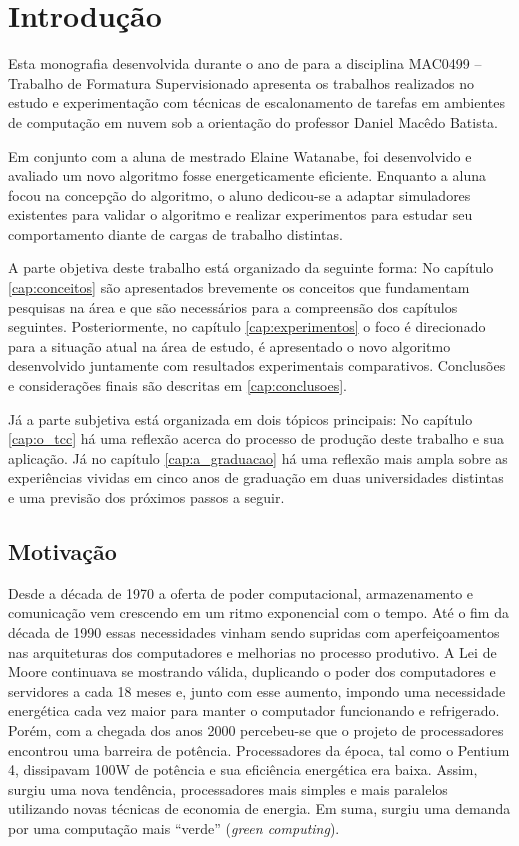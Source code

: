 \chapter{Introdução}
\label{cap:introducao}
Esta monografia desenvolvida durante o ano de  para a disciplina MAC0499 --
Trabalho de Formatura Supervisionado apresenta os trabalhos realizados no estudo
e experimentação com técnicas de escalonamento de tarefas em ambientes de 
computação em nuvem sob a orientação do professor Daniel Macêdo Batista.

Em conjunto com a aluna de mestrado Elaine Watanabe, foi desenvolvido e avaliado
um novo algoritmo fosse energeticamente eficiente. Enquanto a aluna focou na
concepção do algoritmo, o aluno dedicou-se a adaptar simuladores existentes para
validar o algoritmo e realizar experimentos para estudar seu comportamento 
diante de cargas de trabalho distintas.

A parte objetiva deste trabalho está organizado da seguinte forma: No capítulo
\ref{cap:conceitos} são apresentados brevemente os conceitos que fundamentam
pesquisas na área e que são necessários para a compreensão dos capítulos
seguintes. Posteriormente, no capítulo \ref{cap:experimentos} o foco é
direcionado para a situação atual na área de estudo, é apresentado o novo
algoritmo desenvolvido juntamente com resultados experimentais
comparativos. Conclusões e considerações finais são descritas em
\ref{cap:conclusoes}.

Já a parte subjetiva está organizada em dois tópicos principais: No capítulo 
\ref{cap:o_tcc} há uma reflexão acerca do processo de produção deste trabalho
e sua aplicação. Já no capítulo \ref{cap:a_graduacao} há uma reflexão mais ampla
sobre as experiências vividas em cinco anos de graduação em duas universidades
distintas e uma previsão dos próximos passos a seguir.


\section{Motivação}
\label{sec:motivacao}
Desde a década de 1970 a oferta de poder computacional, armazenamento e
comunicação vem crescendo em um ritmo exponencial com o tempo. Até o fim da
década de 1990 essas necessidades vinham sendo supridas com aperfeiçoamentos nas
arquiteturas dos computadores e melhorias no processo produtivo. A Lei de Moore
continuava se mostrando válida, duplicando o poder dos computadores e servidores
a cada 18 meses e, junto com esse aumento, impondo uma necessidade energética
cada vez maior para manter o computador funcionando e refrigerado. Porém, com a
chegada dos anos 2000 percebeu-se que o projeto de processadores encontrou uma
barreira de potência. Processadores da época, tal como o Pentium 4, dissipavam
100W de potência e sua eficiência energética era baixa. \cite{patterson:computer_organization}
Assim, surgiu uma nova tendência, processadores mais simples e mais paralelos
utilizando novas técnicas de economia de energia. Em suma, surgiu uma demanda
por uma computação mais ``verde'' (\emph{green computing}).

